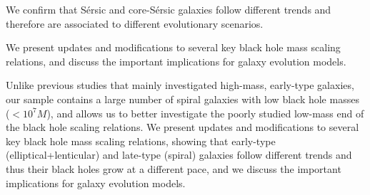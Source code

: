 
We confirm that S\'ersic and core-S\'ersic galaxies follow different trends and therefore are associated to different evolutionary scenarios. 


We present updates and modifications to several key black hole mass scaling relations, 
and discuss the important implications for galaxy evolution models. 



Unlike previous studies that mainly investigated high-mass, early-type galaxies, 
our sample contains a large number of spiral galaxies with low black hole masses ($<10^7 M$), 
and allows us to better investigate the poorly studied low-mass end of the black hole scaling relations.
We present updates and modifications to several key black hole mass scaling relations, showing that early-type (elliptical+lenticular) 
and late-type (spiral) galaxies follow different trends and thus their black holes grow at a different pace, 
and we discuss the important implications for galaxy evolution models. 

